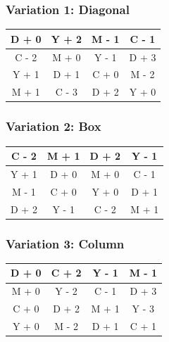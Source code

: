 \documentclass{article}
\begin{document}
    \subsubsection{Variation 1: Diagonal}
        \def\arraystretch{2}
        \begin{center}
            \begin{tabular}{|c|c|c|c|}
                \hline
                \cellcolor{yellow} D + 0 & Y + 2 & M - 1 & C - 1 \\
                \hline
                C - 2 & \cellcolor{green} M + 0 & Y - 1 & D + 3 \\
                \hline
                Y + 1 & D + 1 & \cellcolor{aqua} C + 0 & M - 2 \\
                \hline
                M + 1 & C - 3 & D + 2 & \cellcolor{orange} Y + 0 \\
                \hline
            \end{tabular}
        \end{center}
    \subsubsection{Variation 2: Box}
        \def\arraystretch{2}
        \begin{center}
            \begin{tabular}{|c|c|c|c|}
                \hline
                C - 2 & M + 1 & D + 2 & Y - 1 \\
                \hline
                Y + 1 & \cellcolor{yellow} D + 0 & \cellcolor{green} M + 0 & C - 1 \\
                \hline
                M - 1 & \cellcolor{aqua} C + 0 & \cellcolor{orange} Y + 0 & D + 1 \\
                \hline
                D + 2 & Y - 1 & C - 2 & M + 1 \\
                \hline
            \end{tabular}
        \end{center}
        
        
    \subsubsection{Variation 3: Column}
        \def\arraystretch{2}
        \begin{center}
            \begin{tabular}{|c|c|c|c|}
                \hline
                \cellcolor{yellow} D + 0 & C + 2 & Y - 1 & M - 1 \\
                \hline
                \cellcolor{green} M + 0 & Y - 2 & C - 1 & D + 3 \\
                \hline
                \cellcolor{aqua} C + 0 & D + 2 & M + 1 & Y - 3 \\
                \hline
                \cellcolor{orange} Y + 0 & M - 2 & D + 1 & C + 1 \\
                \hline
            \end{tabular}
        \end{center}
        
\end{document}
